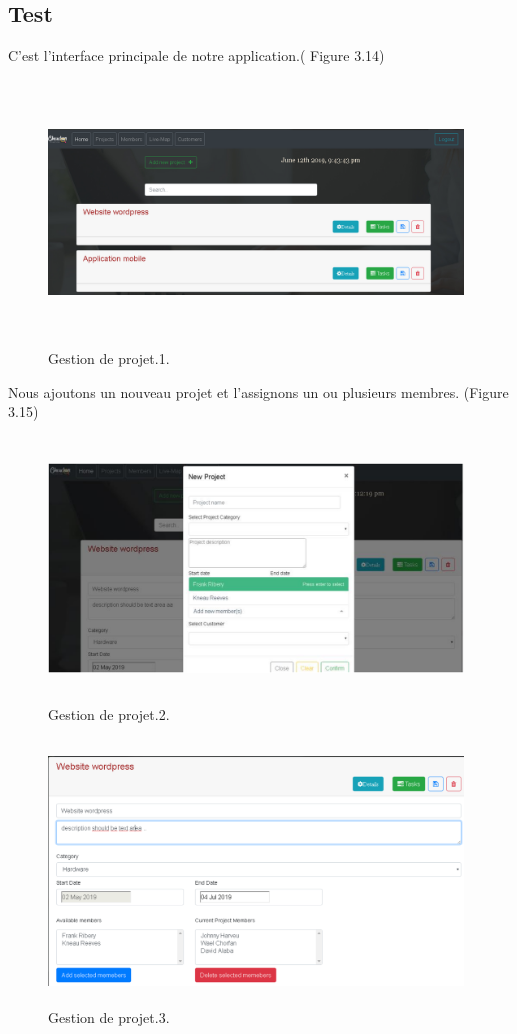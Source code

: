 \subsection{Test}
C'est l'interface principale de notre application.( Figure 3.14)

\begin{figure}[H]
\center
\includegraphics[width=11cm,height=7cm]{./figures/pres/gp1.png}
\caption{Gestion de projet.1.}
\end{figure}


Nous ajoutons un nouveau projet et l'assignons un ou plusieurs membres. (Figure 3.15)

\begin{figure}[H]
\center
\includegraphics[width=11cm,height=7cm]{./figures/pres/gp2.png}
\caption{Gestion de projet.2.}
\end{figure}



\begin{figure}[H]
\center
\includegraphics[width=11cm,height=7cm]{./figures/pres/gp3.png}
\caption{Gestion de projet.3.}
\end{figure}


